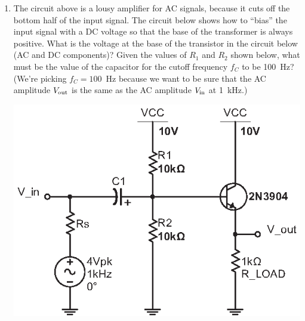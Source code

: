 \begin{enumerate}[wide]
\item The circuit above is a lousy amplifier for AC signals, because it cuts off the bottom half of the input signal.  The circuit below shows how to ``bias'' the input signal with a DC voltage so that the base of the transformer is always positive.  What is the voltage at the base of the transistor in the circuit below (AC and DC components)?  Given the values of $R_1$ and $R_2$ shown below, what must be the value of the capacitor for the cutoff frequency $f_C$ to be 100~Hz?  (We're picking $f_C=100$~Hz because we want to be sure that the AC amplitude $V_{\rm out}$ is the same as the AC amplitude $V_{\rm in}$ at 1~kHz.)
\begin{center}
\vspace{-0.08in}
\includegraphics{bjt/emit_follower_biased_input.eps}
\vspace{-0.08in}
\end{center}


\end{enumerate}
